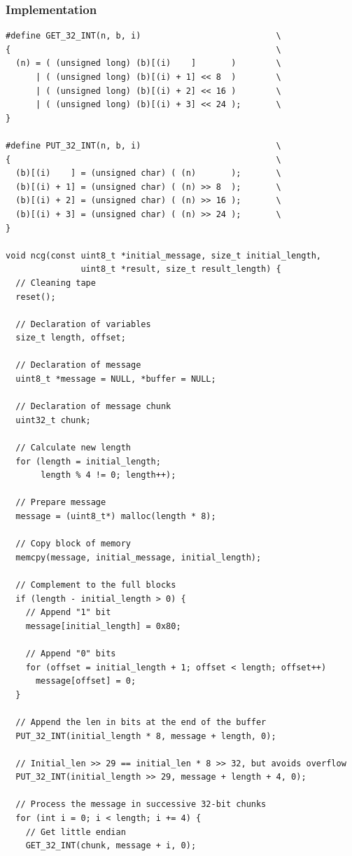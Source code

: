 \documentclass[twocolumn, a4paper, 10pt]{article}
\begin{document}
\subsubsection{Implementation}

\begin{lstlisting}[style=codeAppendix]
#define GET_32_INT(n, b, i)                           \
{                                                     \
  (n) = ( (unsigned long) (b)[(i)    ]       )        \
      | ( (unsigned long) (b)[(i) + 1] << 8  )        \
      | ( (unsigned long) (b)[(i) + 2] << 16 )        \
      | ( (unsigned long) (b)[(i) + 3] << 24 );       \
}

#define PUT_32_INT(n, b, i)                           \
{                                                     \
  (b)[(i)    ] = (unsigned char) ( (n)       );       \
  (b)[(i) + 1] = (unsigned char) ( (n) >> 8  );       \
  (b)[(i) + 2] = (unsigned char) ( (n) >> 16 );       \
  (b)[(i) + 3] = (unsigned char) ( (n) >> 24 );       \
}

void ncg(const uint8_t *initial_message, size_t initial_length,
               uint8_t *result, size_t result_length) {
  // Cleaning tape
  reset();

  // Declaration of variables
  size_t length, offset;

  // Declaration of message
  uint8_t *message = NULL, *buffer = NULL;

  // Declaration of message chunk
  uint32_t chunk;

  // Calculate new length
  for (length = initial_length;
       length % 4 != 0; length++);

  // Prepare message
  message = (uint8_t*) malloc(length * 8);

  // Copy block of memory
  memcpy(message, initial_message, initial_length);

  // Complement to the full blocks
  if (length - initial_length > 0) {
    // Append "1" bit
    message[initial_length] = 0x80;

    // Append "0" bits
    for (offset = initial_length + 1; offset < length; offset++)
      message[offset] = 0;
  }

  // Append the len in bits at the end of the buffer
  PUT_32_INT(initial_length * 8, message + length, 0);

  // Initial_len >> 29 == initial_len * 8 >> 32, but avoids overflow
  PUT_32_INT(initial_length >> 29, message + length + 4, 0);

  // Process the message in successive 32-bit chunks
  for (int i = 0; i < length; i += 4) {
    // Get little endian
    GET_32_INT(chunk, message + i, 0);


\end{lstlisting}
\end{document}
